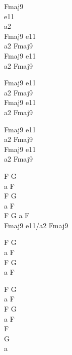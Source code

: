 \begin{chord}
Fmaj9\\
e11\\
a2\\
Fmaj9 e11\\
a2 Fmaj9\\
Fmaj9 e11\\
a2 Fmaj9

Fmaj9 e11\\
a2 Fmaj9\\
Fmaj9 e11\\
a2 Fmaj9

Fmaj9 e11\\
a2 Fmaj9\\
Fmaj9 e11\\
a2 Fmaj9

F G\\
a F\\
F G\\
a F\\
F G a F\\
Fmaj9 e11/a2 Fmaj9

F G\\
a F\\
F G\\
a F

F G\\
a F\\
F G\\
a F\\
F\\
G\\
a

\\
\\
\end{chord}
